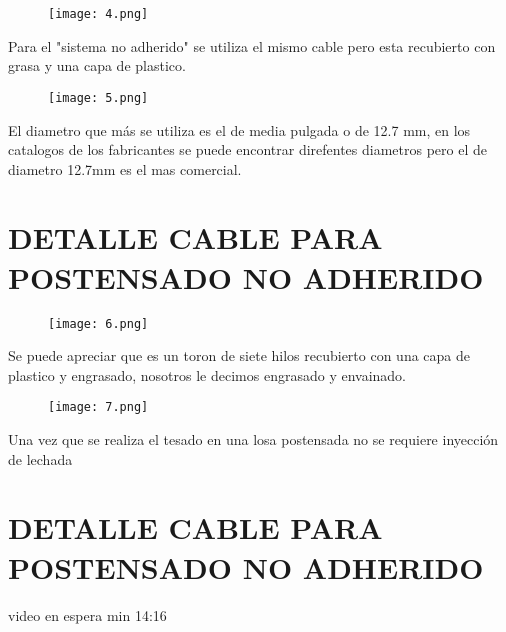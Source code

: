 \begin{figure}[H]
\centering
\texttt{[image: 4.png]}
\end{figure}

Para el "sistema no adherido" se utiliza el mismo cable pero esta recubierto
con grasa y una capa de plastico.

\begin{figure}[H]
\centering
\texttt{[image: 5.png]}
\end{figure}

El diametro que más se utiliza es el de media pulgada o de 12.7 mm, en los catalogos
de los fabricantes se puede encontrar direfentes diametros pero el de diametro 12.7mm
es el mas comercial.

\section{DETALLE CABLE PARA POSTENSADO NO ADHERIDO}

\begin{figure}[H]
\centering
\texttt{[image: 6.png]}
\end{figure}

Se puede apreciar que es un toron de siete hilos recubierto con una capa de plastico
y engrasado, nosotros le decimos engrasado y envainado.

\begin{figure}[H]
\centering
\texttt{[image: 7.png]}
\end{figure}

Una vez que se realiza el tesado en una losa postensada no se requiere inyección
de lechada

\section{DETALLE CABLE PARA POSTENSADO NO ADHERIDO}

video en espera min 14:16

